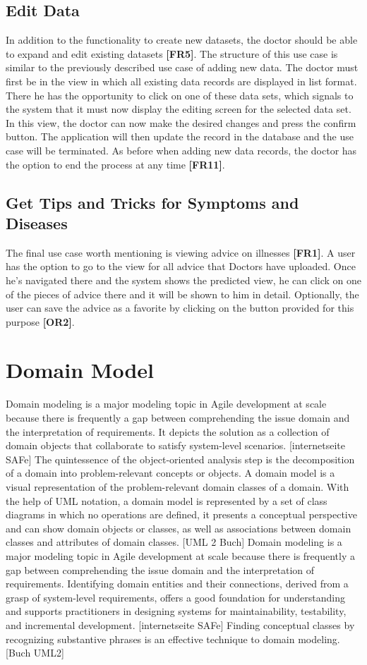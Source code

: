 \subsection{Edit Data}
In addition to the functionality to create new datasets, the doctor should be able to expand and edit existing datasets \textbf{[FR5]}. The structure of this use case is similar to the previously described use case of adding new data. The doctor must first be in the view in which all existing data records are displayed in list format. There he has the opportunity to click on one of these data sets, which signals to the system that it must now display the editing screen for the selected data set. In this view, the doctor can now make the desired changes and press the confirm button. The application will then update the record in the database and the use case will be terminated. As before when adding new data records, the doctor has the option to end the process at any time \textbf{[FR11]}.

\subsection{Get Tips and Tricks for Symptoms and Diseases}
The final use case worth mentioning is viewing advice on illnesses \textbf{[FR1]}. A user has the option to go to the view for all advice that Doctors have uploaded. Once he's navigated there and the system shows the predicted view, he can click on one of the pieces of advice there and it will be shown to him in detail. Optionally, the user can save the advice as a favorite by clicking on the button provided for this purpose \textbf{[OR2]}. 

\section{Domain Model}
Domain modeling is a major modeling topic in Agile development at scale because there is frequently a gap between comprehending the issue domain and the interpretation of requirements. It depicts the solution as a collection of domain objects that collaborate to satisfy system-level scenarios. [internetseite SAFe] The quintessence of the object-oriented analysis step is the decomposition of a domain into problem-relevant concepts or objects. A domain model is a visual representation of the problem-relevant domain classes of a domain. With the help of UML notation, a domain model is represented by a set of class diagrams in which no operations are defined, it presents a conceptual perspective and can show domain objects or classes, as well as associations between domain classes and attributes of domain classes. [UML 2 Buch]  Domain modeling is a major modeling topic in Agile development at scale because there is frequently a gap between comprehending the issue domain and the interpretation of requirements. Identifying domain entities and their connections, derived from a grasp of system-level requirements, offers a good foundation for understanding and supports practitioners in designing systems for maintainability, testability, and incremental development. [internetseite SAFe] Finding conceptual classes by recognizing substantive phrases is an effective technique to domain modeling. [Buch UML2]

